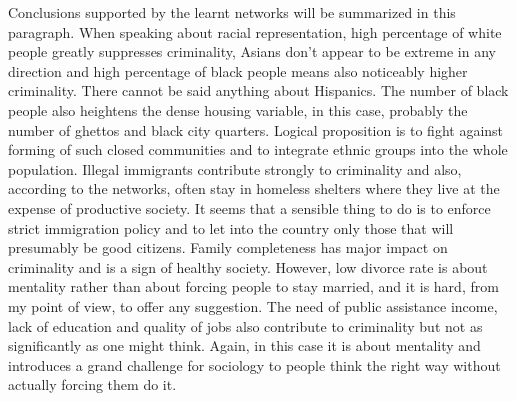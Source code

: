 \documentclass[english,cover]{fitthesis} %
\begin{document}
Conclusions supported by the learnt networks will be summarized in this paragraph.
When speaking about racial representation, high percentage of white people greatly suppresses criminality, Asians don't appear to be extreme in any direction and high percentage of black people means also noticeably higher criminality. There cannot be said anything about Hispanics. The number of black people also heightens the dense housing variable, in this case, probably the number of ghettos and black city quarters. Logical proposition is to fight against forming of such closed communities and to integrate ethnic groups into the whole population.
Illegal immigrants contribute strongly to criminality and also, according to the networks, often stay in homeless shelters where they live at the expense of productive society. It seems that a sensible thing to do is to enforce strict immigration policy and to let into the country only those that will presumably be good citizens.
Family completeness has major impact on criminality and is a sign of healthy society. However, low divorce rate is about mentality rather than about forcing people to stay married, and it is hard, from my point of view, to offer any suggestion.
The need of public assistance income, lack of education and quality of jobs also contribute to criminality but not as significantly as one might think. Again, in this case it is about mentality and introduces a grand challenge for sociology to  people think the right way without actually forcing them do it.
\end{document}
